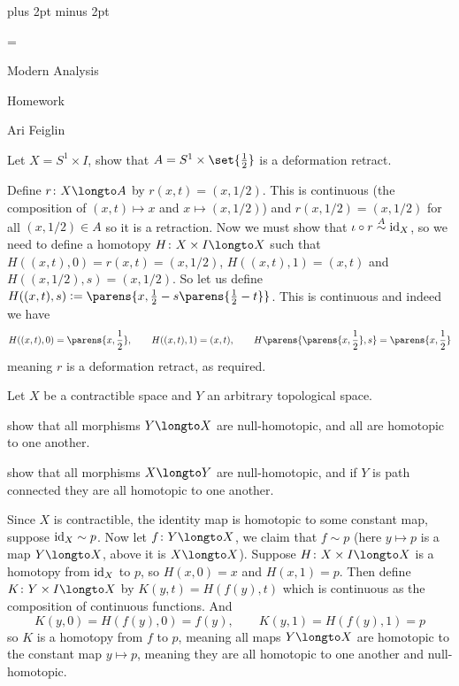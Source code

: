

\parindent=0pt
\parskip=3pt plus 2pt minus 2pt



\footline={}

\setcounter{section}{2}


\def\printmcount{\the\counter{section}.\the\counter{math counter}}

{

    \centerline{Modern Analysis}
    \smallskip
    \centerline{Homework \the{}}
    \centerline{Ari Feiglin}

\eppbox}

\bexerc

    Let $X=S^1\times I$, show that $A=S^1\times\set{\frac12}$ is a deformation retract.

\eexerc

Define $r\colon X\longto A$ by $r(x,t)=(x,1/2)$.
This is continuous (the composition of $(x,t)\mapsto x$ and $x\mapsto(x,1/2)$) and $r(x,1/2)=(x,1/2)$ for all $(x,1/2)\in A$ so it is a retraction.
Now we must show that $\iota\circ r\htopic A{\rm id}_X$, so we need to define a homotopy $H\colon X\times I\longto X$ such that $H((x,t),0)=r(x,t)=(x,1/2)$, $H((x,t),1)=(x,t)$ and $H((x,1/2),s)=(x,1/2)$.
So let us define $H((x,t),s)\coloneqq\parens{x,\frac12-s\parens{\frac12-t}}$.
This is continuous and indeed we have
$$ H((x,t),0) = \parens{x,\frac12},\qquad H((x,t),1) = (x,t),\qquad H\parens{\parens{x,\frac12},s} = \parens{x,\frac12} $$
meaning $r$ is a deformation retract, as required.

\bexerc

    Let $X$ be a contractible space and $Y$ an arbitrary topological space.
    \benum
        \item show that all morphisms $Y\longto X$ are null-homotopic, and all are homotopic to one another.
        \item show that all morphisms $X\longto Y$ are null-homotopic, and if $Y$ is path connected they are all homotopic to one another.
    \eenum

\eexerc

\benum
    \item Since $X$ is contractible, the identity map is homotopic to some constant map, suppose ${\rm id}_X\sim p$.
    Now let $f\colon Y\longto X$, we claim that $f\sim p$ (here $y\mapsto p$ is a map $Y\longto X$, above it is $X\longto X$).
    Suppose $H\colon X\times I\longto X$ is a homotopy from ${\rm id}_X$ to $p$, so $H(x,0)=x$ and $H(x,1)=p$.
    Then define $K\colon Y\times I\longto X$ by $K(y,t)=H(f(y),t)$ which is continuous as the composition of continuous functions.
    And
    $$ K(y,0) = H(f(y),0) = f(y),\qquad K(y,1) = H(f(y),1) = p $$
    so $K$ is a homotopy from $f$ to $p$, meaning all maps $Y\longto X$ are homotopic to the constant map $y\mapsto p$, meaning they are all homotopic to one another and null-homotopic.

